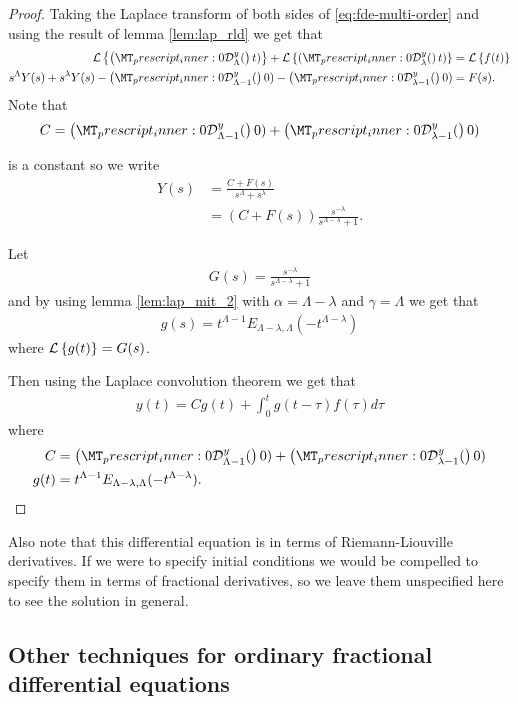 \begin{proof}

	Taking the Laplace transform of both sides of \ref{eq:fde-multi-order} and using the result of lemma \ref{lem:lap_rld}
	we get that 
	\begin{align}
		\laplace{\rld{0}{\Lambda}{y}(t)} + \laplace{\rld{0}{\lambda}{y}(t)} &= \laplace{f(t)} \\
		s^\Lambda Y(s) + s^\lambda Y(s) - \rld{0}{\Lambda-1}{y}(0) - \rld{0}{\lambda-1}{y}(0) &= F(s).
	\end{align}
	Note that 
	\begin{align}
	    C = \rld{0}{\Lambda-1}{y}(0) + \rld{0}{\lambda-1}{y}(0)
	\end{align}
	 
	is a constant so we write
	\begin{align}
		Y(s) &= \frac{C + F(s)}{s^\Lambda + s^\lambda} \\
			&= \left( C + F(s)\right) \frac{s^{-\lambda}}{s^{\Lambda-\lambda} + 1}.
	\end{align}
	
	Let 
	\begin{align} 
	    G(s) = \frac{s^{-\lambda}}{s^{\Lambda-\lambda} + 1} 
	\end{align}
	and by using lemma \ref{lem:lap_mit_2} with $ \alpha = \Lambda - \lambda $ and $ \gamma = \Lambda $
	we get that 
	\begin{align}
	    g(s) = t^{\Lambda  -1}E_{\Lambda - \lambda, \Lambda}(-t^{\Lambda - \lambda})
	\end{align} where $ \mathcal{L} \left\{ g(t) \right\} = G(s) $.
	
	Then using the Laplace convolution theorem we get that 
	\begin{align}
		y(t) = C g(t) + \int_0^t g(t-\tau)f(\tau) d\tau
	\end{align}
	where
	\begin{align}
		C &= \rld{0}{\Lambda-1}{y}(0) + \rld{0}{\lambda-1}{y}(0) \\
		g(t) &= t^{\Lambda - 1} E_{\Lambda - \lambda, \Lambda}(-t^{\Lambda - \lambda}).
	\end{align}
\end{proof}
Also note that this differential equation is in terms of Riemann-Liouville derivatives. If we were to specify
initial conditions we would be compelled to specify them in terms of fractional derivatives, so we leave them
unspecified here to see the solution in general.

\subsection{Other techniques for ordinary fractional differential equations}

